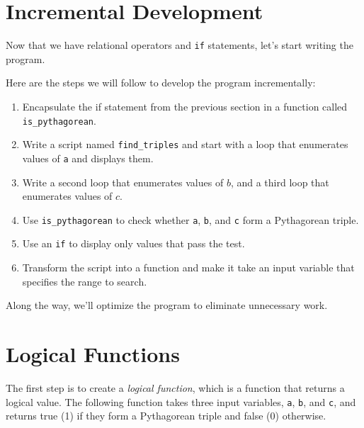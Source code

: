 


\section{Incremental Development}
\label{increxample}

Now that we have relational operators and {\tt if} statements, let's start writing
the program.

Here are the steps we will follow to develop the program incrementally:

\begin{enumerate}

\item Encapsulate the if statement from the previous section in a function called \verb"is_pythagorean".

\item Write a script named \verb"find_triples" and start with a loop that enumerates values of {\tt a} and displays them.

\item Write a second loop that enumerates values of $b$, and a third loop that enumerates values of $c$.

\item Use \verb"is_pythagorean" to check whether {\tt a}, {\tt b}, and {\tt c} form a Pythagorean triple.

\item Use an {\tt if} to display only values that pass the test.

\item Transform the script into a function and make it take an input variable that specifies the range to search.

\end{enumerate}

Along the way, we'll optimize the program to eliminate unnecessary work.


\section{Logical Functions}

The first step is to create a {\em logical function}, which is a function that returns a logical value.
The following function takes three input variables, {\tt a}, {\tt b}, and {\tt c}, and returns true (1) if they form a Pythagorean triple and false (0) otherwise.

